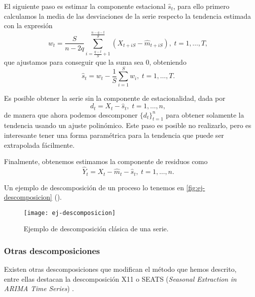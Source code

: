 El siguiente paso es estimar la componente estacional $\hat{s}_t$, para ello primero calculamos la media de las desviaciones de la serie respecto la tendencia estimada con la expresión
\begin{equation}
  w_t = \dfrac{S}{n - 2q} \sum \limits^{\frac{n - q - t}{S}}_{i = \frac{q - t}{S} + 1} \left(X_{t + iS} - \hat{m}_{t + iS}\right), \; t = 1, \ldots, T,
  \label{eq:decomp-3}
\end{equation}
que ajustamos para conseguir que la suma sea 0, obteniendo
\begin{equation*}
  \hat{s}_t = w_t - \dfrac{1}{S}\sum \limits^S_{i = 1} w_i, \; t = 1, \ldots, T.
  \label{eq:decomp-4}
\end{equation*}

Es posible obtener la serie sin la componente de estacionalidad, dada por
\begin{equation*}
  d_t = X_t - \hat{s}_t, \; t = 1, \ldots, n,
  \label{eq:decomp-5}
\end{equation*}
de manera que ahora podemos descomponer $\{d_t\}_{t = 1}^n$ para obtener solamente la tendencia usando un ajuste polinómico. Este paso es posible no realizarlo, pero es interesante tener una forma paramétrica para la tendencia que puede ser extrapolada fácilmente.

Finalmente, obtenemos estimamos la componente de residuos como
\begin{equation*}
  \hat{Y}_t = X_t - \hat{m}_t - \hat{s}_t, \; t = 1, \ldots, n.
  \label{eq:decomp-6}
\end{equation*}

Un ejemplo de descomposición de un proceso lo tenemos en \autoref{fig:ej-descomposicion} (\cite{hyndman2018forecasting}).

\begin{figure}[htpb]
  \centering
  \texttt{[image: ej-descomposicion]}
  \caption{Ejemplo de descomposición clásica de una serie.}
  \label{fig:ej-descomposicion}
\end{figure}

\subsubsection{Otras descomposiciones}

Existen otras descomposiciones que modifican el método que hemos descrito, entre ellas destacan la descomposición X11 \cite{shiskin1965x, dagum2016seasonal} o SEATS (\emph{Seasonal Extraction in ARIMA Time Series}) \cite{gomez1995programs, dagum2016seasonal}.

